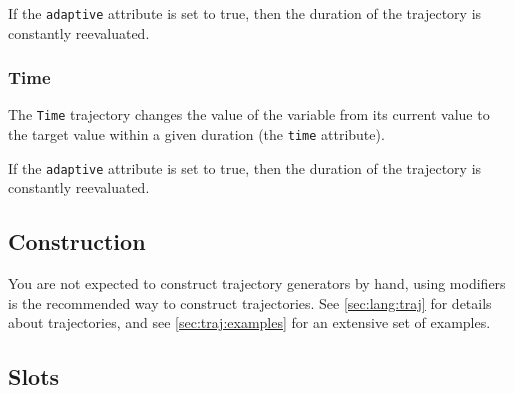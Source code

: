 
If the \lstinline{adaptive} attribute is set to true, then the
duration of the trajectory is constantly reevaluated.


\subsubsection{Time}

The \lstinline{Time} trajectory changes the value of the variable from
its current value to the target value within a given duration (the
\lstinline{time} attribute).


If the \lstinline{adaptive} attribute is set to true, then the
duration of the trajectory is constantly reevaluated.


\let\subsubsection\subsubsectionOrig

\subsection{Construction}

You are not expected to construct trajectory generators by hand, using
modifiers is the recommended way to construct trajectories.  See
\autoref{sec:lang:traj} for details about trajectories, and see
\autoref{sec:traj:examples} for an extensive set of examples.

\subsection{Slots}

